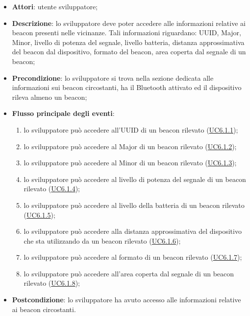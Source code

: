 \documentclass[../AnalisiDeiRequisiti.tex]{subfiles}
\begin{document}
\begin{itemize}
\item \textbf{Attori}: utente sviluppatore;
\item \textbf{Descrizione}: lo sviluppatore deve poter accedere alle informazioni relative ai beacon presenti nelle vicinanze. Tali informazioni riguardano: UUID, Major, Minor, livello di potenza del segnale, livello batteria, distanza approssimativa del beacon dal dispositivo, formato del beacon, area coperta dal segnale di un beacon; 
      \item \textbf{Precondizione}: lo sviluppatore si trova nella sezione dedicata alle informazioni sui beacon circostanti, ha il Bluetooth attivato ed il dispositivo rileva almeno un beacon;

        \item \textbf{Flusso principale degli eventi}:
          \begin{enumerate}
          \item lo sviluppatore può accedere all'UUID di un beacon rilevato (\hyperlink{UC6.1.1}{UC6.1.1});
          \item lo sviluppatore può accedere al Major di un beacon rilevato (\hyperlink{UC6.1.2}{UC6.1.2});
          \item lo sviluppatore può accedere al Minor di un beacon rilevato (\hyperlink{UC6.1.3}{UC6.1.3});
          \item lo sviluppatore può accedere al livello di potenza del segnale di un beacon rilevato (\hyperlink{UC6.1.4}{UC6.1.4});
          \item lo sviluppatore può accedere al livello della batteria di un beacon rilevato (\hyperlink{UC6.1.5}{UC6.1.5});
          \item lo sviluppatore può accedere alla distanza approssimativa del dispositivo che sta utilizzando da un beacon rilevato (\hyperlink{UC6.1.6}{UC6.1.6});
          \item lo sviluppatore può accedere al formato di un beacon rilevato (\hyperlink{UC6.1.7}{UC6.1.7});
          \item lo sviluppatore può accedere all'area coperta dal segnale di un beacon rilevato (\hyperlink{UC6.1.8}{UC6.1.8});

      \end{enumerate}
    \item \textbf{Postcondizione}: lo sviluppatore ha avuto accesso alle informazioni relative ai beacon circostanti.
  \end{itemize}
\hypertarget{UC6.1.1}{}
\end{document}
